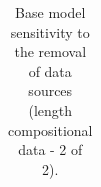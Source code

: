 \documentclass[
  english,
]{article}
\begin{document}
\begin{landscape}
\begin{longtable}[t]
\end{longtable}

\endgroup{}


\end{landscape}

\clearpage

\begin{landscape}
\begingroup\fontsize{9}{11}\selectfont

\begin{longtable}[t]{ll>{\raggedright\arraybackslash}p{4em}>{\raggedright\arraybackslash}p{4em}>{\raggedright\arraybackslash}p{4em}>{\raggedright\arraybackslash}p{4em}>{\raggedright\arraybackslash}p{4em}>{\raggedright\arraybackslash}p{4em}}

\caption{\label{tbl-sensitivities-like-comps-len2}Base model sensitivity
to the removal of data sources (length compositional data - 2 of 2).}

\tabularnewline


\end{longtable}
\end{landscape}
\end{document}
